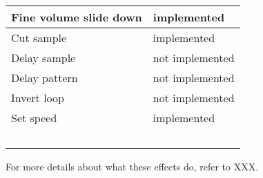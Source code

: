 \begin{table}
\begin{tabular}{|l|l|}
        \hline
        Fine volume slide down & implemented \\
        \hline
        Cut sample & implemented \\
        \hline
        Delay sample & not implemented \\
        \hline
        Delay pattern & not implemented \\
        \hline
        Invert loop & not implemented \\
        \hline
        Set speed & implemented \\
        \hline
        \end{tabular}
\end{table}

For more details about what these effects do, refer to XXX.
